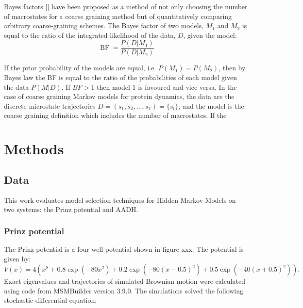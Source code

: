 Bayes factors [] have been proposed as a method of not only choosing the number of macrostates for a coarse graining method but of quantitatively comparing arbitrary coarse-graining schemes. The Bayes factor of two models, $M_{1}$ and $M_{2}$ is equal to the ratio of the integrated likelihood of the data, $D$, given the model: 
\begin{equation}
\operatorname{BF} = \frac{P(D|M_1)}{P(D|M_2)}
\end{equation}

If the prior probability of the models are equal, i.e. $P(M_1)=P(M_2)$, then by Bayes law the BF is equal to the ratio of the probabilities of each model given the data $P(M|D)$. If $BF > 1$ then model $1$ is favoured and vice versa. In the case of coarse graining Markov models for protein dynamics, the data are the discrete microstate trajectories $D = (s_1, s_2, ..., s_T)= \{s_t\}$, and the model is the coarse graining definition which includes the number of macrostates. If the  




\section{Methods}
\subsection{Data}

This work evaluates model selection techniques for Hidden Markov Models on two systems: the Prinz potential and AADH. 

\subsubsection{Prinz potential}
The Prinz potential \cite{prinzMarkovModelsMolecular2011} is a four well potential shown in figure xxx. The potential is given by: 
\begin{equation}
       V(x) = 4\left(x^8 + 0.8 \exp{\left(-80 x^2\right)} + 0.2 \exp{\left(-80 (x-0.5)^2\right)} + 0.5\exp{\left(-40 (x+0.5)^2\right)}\right).
\end{equation}
Exact eigenvalues and trajectories of simulated Brownian motion were calculated using code from MSMBuilder \cite{beauchampMSMBuilder2ModelingConformational2011} version 3.9.0.  The simulations solved the following stochastic differential equation: 

